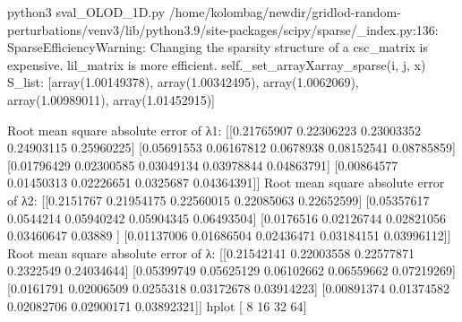 python3 sval_OLOD_1D.py
/home/kolombag/newdir/gridlod-random-perturbations/venv3/lib/python3.9/site-packages/scipy/sparse/_index.py:136: SparseEfficiencyWarning: Changing the sparsity structure of a csc_matrix is expensive. lil_matrix is more efficient.
  self._set_arrayXarray_sparse(i, j, x)
S_list:
[array(1.00149378), array(1.00342495), array(1.0062069), array(1.00989011), array(1.01452915)]

Root mean square absolute error of λ1:
 [[0.21765907 0.22306223 0.23003352 0.24903115 0.25960225]
 [0.05691553 0.06167812 0.0678938  0.08152541 0.08785859]
 [0.01796429 0.02300585 0.03049134 0.03978844 0.04863791]
 [0.00864577 0.01450313 0.02226651 0.0325687  0.04364391]]
Root mean square absolute error of λ2: 
 [[0.2151767  0.21954175 0.22560015 0.22085063 0.22652599]
 [0.05357617 0.0544214  0.05940242 0.05904345 0.06493504]
 [0.0176516  0.02126744 0.02821056 0.03460647 0.03889   ]
 [0.01137006 0.01686504 0.02436471 0.03184151 0.03996112]]
Root mean square absolute error of λ: 
 [[0.21542141 0.22003558 0.22577871 0.2322549  0.24034644]
 [0.05399749 0.05625129 0.06102662 0.06559662 0.07219269]
 [0.0161791  0.02006509 0.0255318  0.03172678 0.03914223]
 [0.00891374 0.01374582 0.02082706 0.02900171 0.03892321]]
hplot [ 8 16 32 64]